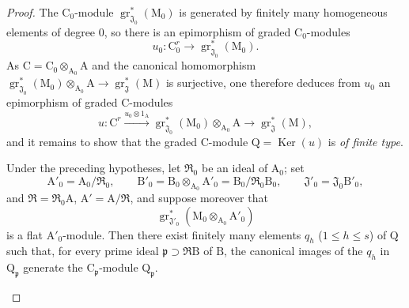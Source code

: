 \begin{proof}
The $\mathrm{C}_0$-module $\operatorname{gr}^*_{\mathfrak{J}_0}(\mathrm{M}_0)$ is generated by finitely many homogeneous elements of degree $0$, so there is an epimorphism of graded $\mathrm{C}_0$-modules
\[
  u_0:\mathrm{C}_0^r\longrightarrow\operatorname{gr}^*_{\mathfrak{J}_0}(\mathrm{M}_0).
\]
As $\mathrm{C}=\mathrm{C}_0\otimes_{\mathrm{A}_0}\mathrm{A}$ and the canonical homomorphism $\operatorname{gr}^*_{\mathfrak{J}_0}(\mathrm{M}_0)\otimes_{\mathrm{A}_0}\mathrm{A}\to\operatorname{gr}^*_\mathfrak{J}(\mathrm{M})$ is surjective, one therefore deduces from $u_0$ an epimorphism of graded $\mathrm{C}$-modules
\[
  u:\mathrm{C}^r\xrightarrow{u_0\otimes 1_{\mathrm{A}}}\operatorname{gr}^*_{\mathfrak{J}_0}(\mathrm{M}_0)\otimes_{\mathrm{A}_0}\mathrm{A}\longrightarrow\operatorname{gr}^*_\mathfrak{J}(\mathrm{M}),
\]
and it remains to show that the graded $\mathrm{C}$-module
$\mathrm{Q}=\operatorname{Ker}(u)$ is \emph{of finite type}.
\\[0.4\baselineskip]
\begin{lemma}[11.2.9.6]
\label{IV.11.2.9.6}
Under the preceding hypotheses, let $\mathfrak{R}_0$ be an ideal of $\mathrm{A}_0$; set
\[
  \mathrm{A}'_0=\mathrm{A}_0/\mathfrak{R}_0,\qquad
  \mathrm{B}'_0=\mathrm{B}_0\otimes_{\mathrm{A}_0}\mathrm{A}'_0
  =\mathrm{B}_0/\mathfrak{R}_0\mathrm{B}_0,\qquad
  \mathfrak{J}'_0=\mathfrak{J}_0\mathrm{B}'_0,
\]
and $\mathfrak{R}=\mathfrak{R}_0\mathrm{A}$, $\mathrm{A}'=\mathrm{A}/\mathfrak{R}$, and suppose moreover that
\[
  \operatorname{gr}^*_{\mathfrak{J}'_0}
  (\mathrm{M}_0\otimes_{\mathrm{A}_0}\mathrm{A}'_0)
\]
is a flat $\mathrm{A}'_0$-module. Then there exist finitely many elements $q_h$ ($1\leqslant h\leqslant s$) of $\mathrm{Q}$ such that, for every prime ideal $\mathfrak{p}\supset\mathfrak{R}\mathrm{B}$ of $\mathrm{B}$, the canonical images of the $q_h$ in $\mathrm{Q}_\mathfrak{p}$ generate the $\mathrm{C}_\mathfrak{p}$-module $\mathrm{Q}_\mathfrak{p}$.
\end{lemma}


\end{proof}
